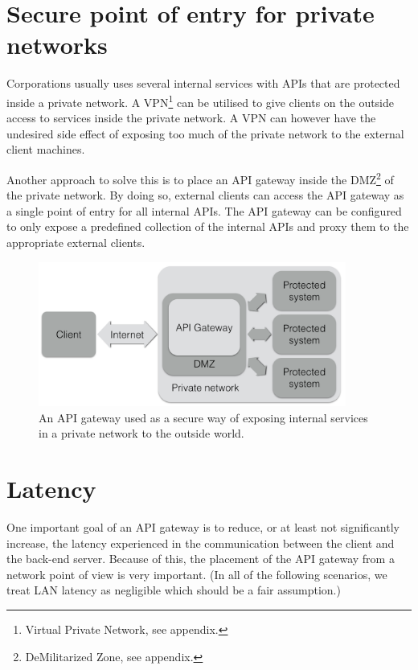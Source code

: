 \documentclass{cslthse-msc}
\begin{document}
\section{Secure point of entry for private networks}
Corporations usually uses several internal services with APIs that are protected inside a private network. A VPN\footnote{Virtual Private Network, see appendix.} can be utilised to give clients on the outside access to services inside the private network. A VPN can however have the undesired side effect of exposing too much of the private network to the external client machines.

Another approach to solve this is to place an API gateway inside the DMZ\footnote{DeMilitarized Zone, see appendix.} of the private network. By doing so, external clients can access the API gateway as a single point of entry for all internal APIs. The API gateway can be configured to only expose a predefined collection of the internal APIs and proxy them to the appropriate external clients.

\begin{figure}[H]
  \centering
    \begin{center}
      \includegraphics[width=0.9\textwidth]{images/api_gateway_dmz.png}
    \end{center}
  \caption{An API gateway used as a secure way of exposing internal services in a private network to the outside world.}
\end{figure}

\section{Latency}
One important goal of an API gateway is to reduce, or at least not significantly increase, the latency experienced in the communication between the client and the back-end server. Because of this, the placement of the API gateway from a network point of view is very important. (In all of the following scenarios, we treat LAN latency as negligible which should be a fair assumption.)
\end{document}
